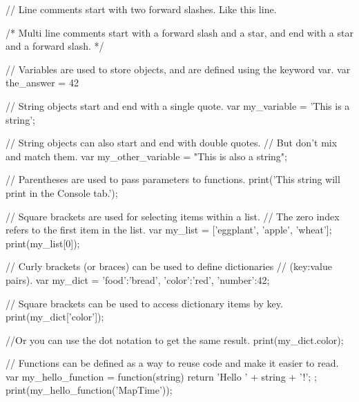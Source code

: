 // Line comments start with two forward slashes. Like this line.

/* Multi line comments start with a forward slash and a star,
and end with a star and a forward slash. */

// Variables are used to store objects, and are defined using the keyword var.
var the_answer = 42

// String objects start and end with a single quote.
var my_variable = 'This is a string';

// String objects can also start and end with double quotes.
// But don't mix and match them.
var my_other_variable = "This is also a string";



// Parentheses are used to pass parameters to functions.
print('This string will print in the Console tab.');


// Square brackets are used for selecting items within a list.  
// The zero index refers to the first item in the list.
var my_list = ['eggplant', 'apple', 'wheat'];
print(my_list[0]);

// Curly brackets (or braces) can be used to define dictionaries
// (key:value pairs).
var my_dict = {'food':'bread', 'color':'red', 'number':42};

// Square brackets can be used to access dictionary items by key.
print(my_dict['color']);

//Or you can use the dot notation to get the same result.
print(my_dict.color);

// Functions can be defined as a way to reuse code and make it easier to read.
var my_hello_function = function(string) {
  return 'Hello ' + string + '!';
};
print(my_hello_function('MapTime'));
